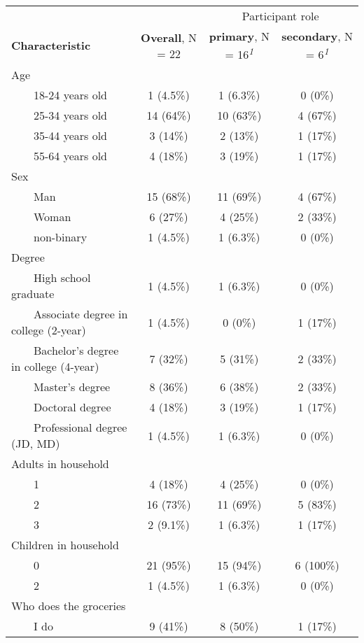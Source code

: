 \setlength{\LTpost}{0mm}
\begin{longtable}{lccc}
\toprule
 &  & \multicolumn{2}{c}{Participant role} \\ 
\cmidrule(lr){3-4}
\textbf{Characteristic} & \textbf{Overall}, N = 22 & \textbf{primary}, N = 16\textsuperscript{\textit{1}} & \textbf{secondary}, N = 6\textsuperscript{\textit{1}} \\ 
\midrule\addlinespace[2.5pt]
Age &  &  &  \\ 
    18-24 years old & 1 (4.5\%) & 1 (6.3\%) & 0 (0\%) \\ 
    25-34 years old & 14 (64\%) & 10 (63\%) & 4 (67\%) \\ 
    35-44 years old & 3 (14\%) & 2 (13\%) & 1 (17\%) \\ 
    55-64 years old & 4 (18\%) & 3 (19\%) & 1 (17\%) \\ 
Sex &  &  &  \\ 
    Man & 15 (68\%) & 11 (69\%) & 4 (67\%) \\ 
    Woman & 6 (27\%) & 4 (25\%) & 2 (33\%) \\ 
    non-binary & 1 (4.5\%) & 1 (6.3\%) & 0 (0\%) \\ 
Degree &  &  &  \\ 
    High school graduate & 1 (4.5\%) & 1 (6.3\%) & 0 (0\%) \\ 
    Associate degree in college (2-year) & 1 (4.5\%) & 0 (0\%) & 1 (17\%) \\ 
    Bachelor's degree in college (4-year) & 7 (32\%) & 5 (31\%) & 2 (33\%) \\ 
    Master's degree & 8 (36\%) & 6 (38\%) & 2 (33\%) \\ 
    Doctoral degree & 4 (18\%) & 3 (19\%) & 1 (17\%) \\ 
    Professional degree (JD, MD) & 1 (4.5\%) & 1 (6.3\%) & 0 (0\%) \\ 
Adults in household &  &  &  \\ 
    1 & 4 (18\%) & 4 (25\%) & 0 (0\%) \\ 
    2 & 16 (73\%) & 11 (69\%) & 5 (83\%) \\ 
    3 & 2 (9.1\%) & 1 (6.3\%) & 1 (17\%) \\ 
Children in household &  &  &  \\ 
    0 & 21 (95\%) & 15 (94\%) & 6 (100\%) \\ 
    2 & 1 (4.5\%) & 1 (6.3\%) & 0 (0\%) \\ 
Who does the groceries &  &  &  \\ 
    I do & 9 (41\%) & 8 (50\%) & 1 (17\%) \\ 

\end{longtable}
